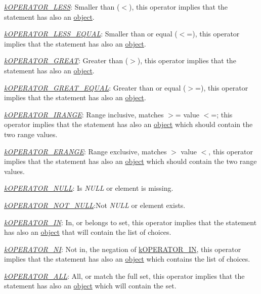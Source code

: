 {\begin{DoxyItemize}
\begin{DoxyItemize}
\item {\itshape \hyperlink{}{k\-O\-P\-E\-R\-A\-T\-O\-R\-\_\-\-L\-E\-S\-S}}\-: Smaller than ($<$), this operator implies that the statement has also an \hyperlink{}{object}. 
\item {\itshape \hyperlink{}{k\-O\-P\-E\-R\-A\-T\-O\-R\-\_\-\-L\-E\-S\-S\-\_\-\-E\-Q\-U\-A\-L}}\-: Smaller than or equal ($<$=), this operator implies that the statement has also an \hyperlink{}{object}. 
\item {\itshape \hyperlink{}{k\-O\-P\-E\-R\-A\-T\-O\-R\-\_\-\-G\-R\-E\-A\-T}}\-: Greater than ($>$), this operator implies that the statement has also an \hyperlink{}{object}. 
\item {\itshape \hyperlink{}{k\-O\-P\-E\-R\-A\-T\-O\-R\-\_\-\-G\-R\-E\-A\-T\-\_\-\-E\-Q\-U\-A\-L}}\-: Greater than or equal ($>$=), this operator implies that the statement has also an \hyperlink{}{object}. 
\item {\itshape \hyperlink{}{k\-O\-P\-E\-R\-A\-T\-O\-R\-\_\-\-I\-R\-A\-N\-G\-E}}\-: Range inclusive, matches $>$= value $<$=; this operator implies that the statement has also an \hyperlink{}{object} which should contain the two range values. 
\item {\itshape \hyperlink{}{k\-O\-P\-E\-R\-A\-T\-O\-R\-\_\-\-E\-R\-A\-N\-G\-E}}\-: Range exclusive, matches $>$ value $<$, this operator implies that the statement has also an \hyperlink{}{object} which should contain the two range values. 
\item {\itshape \hyperlink{}{k\-O\-P\-E\-R\-A\-T\-O\-R\-\_\-\-N\-U\-L\-L}}\-: Is {\itshape N\-U\-L\-L} or element is missing. 
\item {\itshape \hyperlink{}{k\-O\-P\-E\-R\-A\-T\-O\-R\-\_\-\-N\-O\-T\-\_\-\-N\-U\-L\-L}}\-:Not {\itshape N\-U\-L\-L} or element exists. 
\item {\itshape \hyperlink{}{k\-O\-P\-E\-R\-A\-T\-O\-R\-\_\-\-I\-N}}\-: In, or belongs to set, this operator implies that the statement has also an \hyperlink{}{object} that will contain the list of choices. 
\item {\itshape \hyperlink{}{k\-O\-P\-E\-R\-A\-T\-O\-R\-\_\-\-N\-I}}\-: Not in, the negation of \hyperlink{}{k\-O\-P\-E\-R\-A\-T\-O\-R\-\_\-\-I\-N}, this operator implies that the statement has also an \hyperlink{}{object} which contains the list of choices. 
\item {\itshape \hyperlink{}{k\-O\-P\-E\-R\-A\-T\-O\-R\-\_\-\-A\-L\-L}}\-: All, or match the full set, this operator implies that the statement has also an \hyperlink{}{object} which will contain the set. 

\end{DoxyItemize}
\end{DoxyItemize}}

